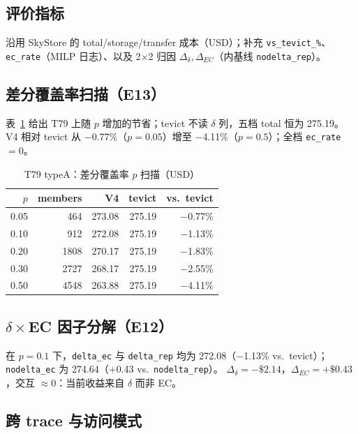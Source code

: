 \documentclass[conference]{IEEEtran}
\begin{document}
\subsection{评价指标}

沿用 SkyStore 的 total/storage/transfer 成本（USD）；补充 \texttt{vs\_tevict\_\%}、\texttt{ec\_rate}（MILP 日志）、以及 2$\times$2 归因
$\Delta_\delta,\Delta_{EC}$（内基线 \texttt{nodelta\_rep}）。

\subsection{差分覆盖率扫描（E13）}

表~\ref{tab:saturation} 给出 T79 上随 $p$ 增加的节省；tevict 不读 $\delta$ 列，五档 total 恒为 275.19。
V4 相对 tevict 从 $-$0.77\%（$p{=}0.05$）增至 $-$4.11\%（$p{=}0.5$）；全档 \texttt{ec\_rate}${=}0$。

\begin{table}[t]
\centering
\caption{T79 typeA：差分覆盖率 $p$ 扫描（USD）}
\label{tab:saturation}
\begin{tabular}{rrrrr}
\toprule
$p$ & members & V4 & tevict & vs.\ tevict \\
\midrule
0.05 & 464   & 273.08 & 275.19 & $-$0.77\% \\
0.10 & 912   & 272.08 & 275.19 & $-$1.13\% \\
0.20 & 1808  & 270.17 & 275.19 & $-$1.83\% \\
0.30 & 2727  & 268.17 & 275.19 & $-$2.55\% \\
0.50 & 4548  & 263.88 & 275.19 & $-$4.11\% \\
\bottomrule
\end{tabular}
\end{table}

\subsection{$\delta\times$EC 因子分解（E12）}

在 $p{=}0.1$ 下，\texttt{delta\_ec} 与 \texttt{delta\_rep} 均为 272.08（$-$1.13\% vs.\ tevict）；
\texttt{nodelta\_ec} 为 274.64（$+$0.43 vs.\ \texttt{nodelta\_rep}）。
$\Delta_\delta{=}{-}\$2.14$，$\Delta_{EC}{=}{+}\$0.43$，交互 $\approx 0$：当前收益来自 $\delta$ 而非 EC。

\subsection{跨 trace 与访问模式}
\end{document}
